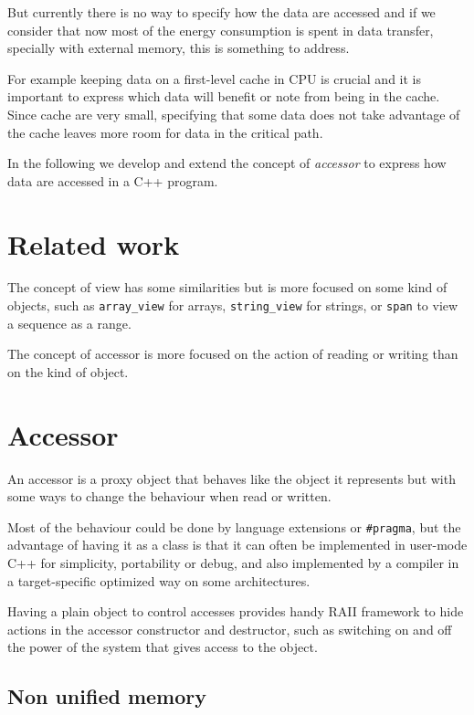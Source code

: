 \documentclass[a4paper]{article}
\begin{document}
But currently there is no way to specify how the data are accessed and
if we consider that now most of the energy consumption is spent in
data transfer, specially with external memory, this is something to
address.

For example keeping data on a first-level cache in CPU is crucial and
it is important to express which data will benefit or note from being
in the cache. Since cache are very small, specifying that some data
does not take advantage of the cache leaves more room for data in the
critical path.

In the following we develop and extend the concept of \emph{accessor}
to express how data are accessed in a C++ program.


\section{Related work}
\label{sec:related-work}

The concept of view has some similarities but is more focused on some
kind of objects, such as \lstinline|array_view| for arrays,
\lstinline|string_view| for strings, or \lstinline|span| to view a
sequence as a range.

The concept of accessor is more focused on the action of reading or
writing than on the kind of object.


\section{Accessor}
\label{sec:accessor}

An accessor is a proxy object that behaves like the object it
represents but with some ways to change the behaviour when read or
written.

Most of the behaviour could be done by language extensions or
\lstinline|#pragma|, but the advantage of having it as a class is that
it can often be implemented in user-mode C++ for simplicity,
portability or debug, and also implemented by a compiler in a
target-specific optimized way on some architectures.

Having a plain object to control accesses provides handy RAII
framework to hide actions in the accessor constructor and destructor,
such as switching on and off the power of the system that gives access
to the object.


\subsection{Non unified memory}
\label{sec:non-unified-memory}
\end{document}
